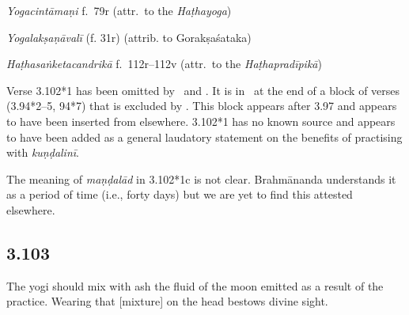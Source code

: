 \begin{ekdosis}

\begin{testimonia}[hp03_102_1]
\emph{Yogacintāmaṇi} f.~79r (attr.~to the \emph{Haṭhayoga})
\begin{versinnote}
\end{versinnote}

\emph{Yogalakṣaṇāvalī} (f. 31r)  (attrib. to Gorakṣaśataka)
\begin{versinnote}
\end{versinnote}

\emph{Haṭhasaṅketacandrikā}  f.~112r--112v (attr.~to the \emph{Haṭhapradīpikā})
\begin{versinnote}
\end{versinnote}
\end{testimonia}

\begin{philcomm}[hp03_102_1]
Verse 3.102*1 has been omitted by \alphaOne\ and \alphaThree. It is in \alphaTwo\ at the end of a block of verses (3.94*2–5, 94*7) that is excluded by \alphaThree. This block appears after 3.97 and appears to have been inserted from elsewhere. 3.102*1 has no known source and appears to have been added as a general laudatory statement on the benefits of practising with \emph{kuṇḍalinī}.

The meaning of \emph{maṇḍalād} in 3.102*1c is not clear. Brahmānanda understands it as a period of time (i.e., forty days) but we are yet to find this attested elsewhere.
\end{philcomm}


\subsection*{3.103}
\begin{translation}[hp03_103]
The yogi should mix with ash the fluid of the moon emitted as a result of the practice. Wearing that [mixture] on the head bestows divine sight.
\end{translation}


\end{ekdosis}
